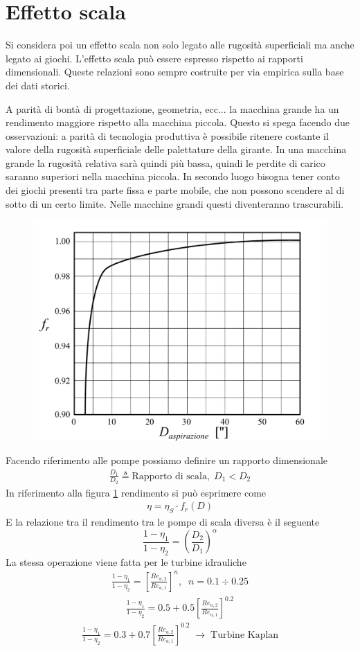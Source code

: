 \section{Effetto scala}
Si considera poi un effetto scala non solo legato alle rugosità superficiali ma anche legato ai giochi. L'effetto scala può essere espresso rispetto ai rapporti dimensionali. Queste relazioni sono sempre costruite per via empirica sulla base dei dati storici.

A parità di bontà di progettazione, geometria, ecc... la macchina grande ha un rendimento maggiore rispetto alla macchina piccola. Questo si spega facendo due osservazioni: a parità di tecnologia produttiva è possibile ritenere costante il valore della rugosità superficiale delle palettature della girante. In una macchina grande la rugosità relativa sarà quindi più bassa, quindi le perdite di carico saranno superiori nella macchina piccola. In secondo luogo bisogna tener conto dei giochi presenti tra parte fissa e parte mobile, che non possono scendere al di sotto di un certo limite. Nelle macchine grandi questi diventeranno trascurabili. 
\begin{figure}
\centering
  \includegraphics[width=.5\textwidth]{fig/dDchart.pdf}
\caption{}
\label{fig:dDchart}
\end{figure}

Facendo riferimento alle pompe possiamo definire un rapporto dimensionale 
\begin{align*}
\frac{D_1}{D_2} \triangleq  \mbox{Rapporto di scala}, \; D_1 < D_2
\end{align*}
In riferimento alla figura \ref{fig:dDchart} rendimento si può esprimere come
\begin{align*}
\eta = \eta_S \cdot f_r(D)
\end{align*}
E la relazione tra il rendimento tra le pompe di scala diversa è il seguente
\begin{equation}
\frac{1-\eta_1}{1-\eta_2} = \left( \frac{D_2}{D_1}\right)^\alpha
\end{equation}
La stessa operazione viene fatta per le turbine idrauliche
\begin{align*}
\frac{1-\eta_1}{1-\eta_2} = \left[ \frac{Re_{u,2}}{Re_{u,1}} \right]^n, \; \; n=0.1 \div 0.25
\end{align*}
\begin{align*}
\frac{1-\eta_1}{1-\eta_2} =0.5 + 0.5 \left[ \frac{Re_{u,2}}{Re_{u,1}} \right]^{0.2}
\end{align*}
\begin{align*}
\frac{1-\eta_1}{1-\eta_2} = 0.3 + 0.7 \left[ \frac{Re_{u,2}}{Re_{u,1}} \right]^{0.2} \; \to \; \mbox{Turbine Kaplan}
\end{align*}

